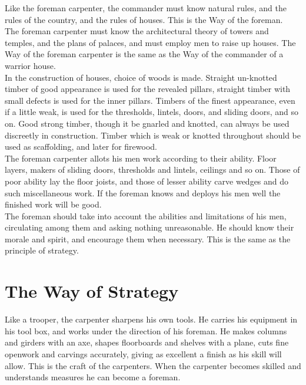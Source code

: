 Like the foreman carpenter, the commander must know natural rules, and the rules of the country, and the rules of houses. This is the Way of the foreman.\\

The foreman carpenter must know the architectural theory of towers and temples, and the plans of palaces, and must employ men to raise up houses. The Way of the foreman carpenter is the same as the Way of the commander of a warrior house.\\

In the construction of houses, choice of woods is made. Straight un-knotted timber of good appearance is used for the revealed pillars, straight timber with small defects is used for the inner pillars. Timbers of the finest appearance, even if a little weak, is used for the thresholds, lintels, doors, and sliding doors, and so on. Good strong timber, though it be gnarled and knotted, can always be used discreetly in construction. Timber which is weak or knotted throughout should be used as scaffolding, and later for firewood.\\

The foreman carpenter allots his men work according to their ability. Floor layers, makers of sliding doors, thresholds and lintels, ceilings and so on. Those of poor ability lay the floor joists, and those of lesser ability carve wedges and do such miscellaneous work. If the foreman knows and deploys his men well the finished work will be good.\\

The foreman should take into account the abilities and limitations of his men, circulating among them and asking nothing unreasonable. He should know their morale and spirit, and encourage them when necessary. This is the same as the principle of strategy.\\
\section{The Way of Strategy}

Like a trooper, the carpenter sharpens his own tools. He carries his equipment in his tool box, and works under the direction of his foreman. He makes columns and girders with an axe, shapes floorboards and shelves with a plane, cuts fine openwork and carvings accurately, giving as excellent a finish as his skill will allow. This is the craft of the carpenters. When the carpenter becomes skilled and understands measures he can become a foreman.\\

